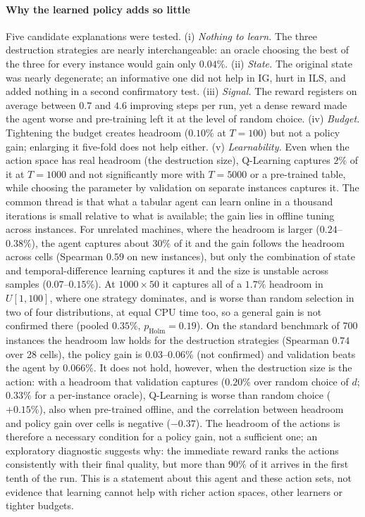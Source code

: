 \documentclass[final,3p,times,11pt,authoryear]{elsarticle}
\begin{document}
\paragraph{Why the learned policy adds so little}
Five candidate explanations were tested. (i) \emph{Nothing to learn.} The three
destruction strategies are nearly interchangeable: an oracle choosing the best of
the three for every instance would gain only $0.04\%$. (ii) \emph{State.} The
original state was nearly degenerate; an informative one did not help in IG, hurt
in ILS, and added nothing in a second confirmatory test. (iii) \emph{Signal.} The
reward registers on average between $0.7$ and $4.6$ improving steps per run, yet
a dense reward made the agent worse and pre-training left it at the level of random
choice. (iv) \emph{Budget.} Tightening the budget creates headroom ($0.10\%$ at
$T=100$) but not a policy gain; enlarging it five-fold does not help either.
(v) \emph{Learnability.} Even when the action space has real headroom (the
destruction size), Q-Learning captures $2\%$ of it at $T=1000$ and not significantly
more with $T=5000$ or a pre-trained table, while choosing the parameter by
validation on separate instances captures it. The common thread is that what a tabular agent can learn
online in a thousand iterations is small relative to what is available; the gain
lies in offline tuning across instances. For unrelated machines, where the
headroom is larger ($0.24$--$0.38\%$), the agent captures about $30\%$ of it and the
gain follows the headroom across cells (Spearman $0.59$ on new instances), but only the
combination of state and temporal-difference learning captures it and the size is
unstable across samples ($0.07$--$0.15\%$). At $1000\times50$ it captures all of a $1.7\%$
headroom in $U[1,100]$, where one strategy dominates, and is worse than random selection
in two of four distributions, at equal CPU time too, so a general gain is not
confirmed there (pooled $0.35\%$, $p_{\mathrm{Holm}}=0.19$). On the standard benchmark of 700 instances the headroom law holds for the destruction strategies (Spearman $0.74$ over 28 cells), the policy gain is $0.03$--$0.06\%$ (not confirmed) and validation beats the agent by $0.066\%$. It does not hold, however, when the destruction size is the action: with a headroom that validation captures ($0.20\%$ over random choice of $d$; $0.33\%$ for a per-instance oracle), Q-Learning is worse than random choice ($+0.15\%$), also when pre-trained offline, and the correlation between headroom and policy gain over cells is negative ($-0.37$). The headroom of the actions is therefore a necessary condition for a policy gain, not a sufficient one; an exploratory diagnostic suggests why: the immediate reward ranks the actions consistently with their final quality, but more than $90\%$ of it arrives in the first tenth of the run. This is a statement about this agent and
these action sets, not evidence that learning cannot help with richer action spaces,
other learners or tighter budgets.
\end{document}
